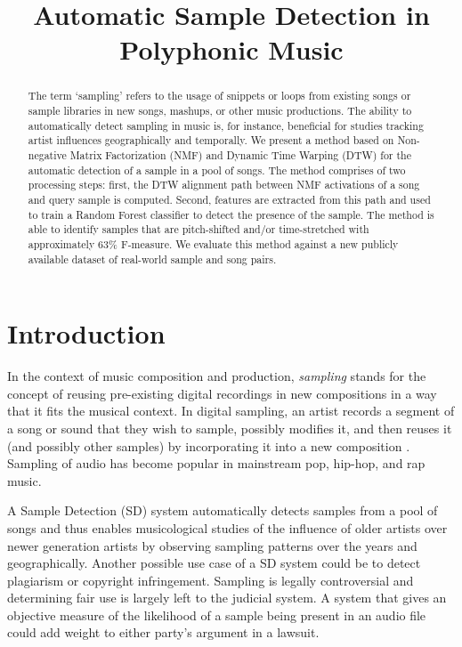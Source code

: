 \documentclass{article}
\title{Automatic Sample Detection in Polyphonic Music}
\begin{document}
%
\maketitle
%
\begin{abstract}
The term `sampling' refers to the usage of snippets or loops from existing songs or sample libraries in new songs, mashups, or other music productions. The ability to automatically detect sampling in music is, for instance, beneficial for studies tracking artist influences geographically and temporally. We present a method based on Non-negative Matrix Factorization (NMF) and Dynamic Time Warping (DTW) for the automatic detection of a sample in a pool of songs. The method comprises of two processing steps: first, the DTW alignment path between NMF activations of a song and query sample is computed. Second, features are extracted from this path and used to train a Random Forest classifier to detect the presence of the sample. The method is able to identify samples that are pitch-shifted and/or time-stretched with approximately 63\% F-measure. We evaluate this method against a new publicly available dataset of real-world sample and song pairs.
\end{abstract}
%
\section{Introduction}
\label{sec:intro}

In the context of music composition and production, \textit{sampling} stands for the concept of reusing pre-existing digital recordings in new compositions in a way that it fits the musical context. In digital sampling, an artist records a segment of a song or sound that they wish to sample, possibly modifies it, and then reuses it (and possibly other samples) by incorporating it into a new composition \cite{katz_capturing_2004}. Sampling of audio has become popular in mainstream pop, hip-hop, and rap music. 

A Sample Detection (SD) system automatically detects samples from a pool of songs and thus enables musicological studies of the influence of older artists over newer generation artists by observing sampling patterns over the years and geographically.
%
Another possible use case of a SD system could be to detect plagiarism or copyright infringement. Sampling is legally controversial and determining fair use is largely left to the judicial system. A system that gives an objective measure of the likelihood of a sample being present in an audio file could add weight to either party's argument in a lawsuit.
\end{document}
